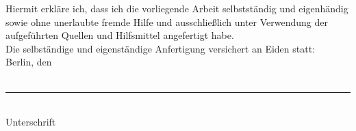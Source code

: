 Hiermit erkläre ich, dass ich die vorliegende Arbeit selbstständig und eigenhändig sowie ohne unerlaubte fremde Hilfe und ausschließlich unter Verwendung der aufgeführten Quellen und Hilfsmittel angefertigt habe.
\\

Die selbständige und eigenständige Anfertigung versichert an Eiden statt:
\\

Berlin, den
\\
\\

\rule{8cm}{0.15mm}\\
Unterschrift
